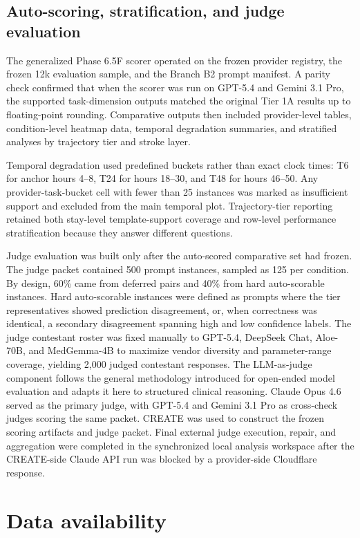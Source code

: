 \documentclass[pdflatex,sn-nature]{sn-jnl}
\begin{document}
\subsection{Auto-scoring, stratification, and judge evaluation}

The generalized Phase 6.5F scorer operated on the frozen provider registry, the frozen 12k evaluation sample, and the Branch B2 prompt manifest. A parity check confirmed that when the scorer was run on GPT-5.4 and Gemini 3.1 Pro, the supported task-dimension outputs matched the original Tier 1A results up to floating-point rounding. Comparative outputs then included provider-level tables, condition-level heatmap data, temporal degradation summaries, and stratified analyses by trajectory tier and stroke layer.

Temporal degradation used predefined buckets rather than exact clock times: T6 for anchor hours 4--8, T24 for hours 18--30, and T48 for hours 46--50. Any provider-task-bucket cell with fewer than 25 instances was marked as insufficient support and excluded from the main temporal plot. Trajectory-tier reporting retained both stay-level template-support coverage and row-level performance stratification because they answer different questions.

Judge evaluation was built only after the auto-scored comparative set had frozen. The judge packet contained 500 prompt instances, sampled as 125 per condition. By design, 60\% came from deferred pairs and 40\% from hard auto-scorable instances. Hard auto-scorable instances were defined as prompts where the tier representatives showed prediction disagreement, or, when correctness was identical, a secondary disagreement spanning high and low confidence labels. The judge contestant roster was fixed manually to GPT-5.4, DeepSeek Chat, Aloe-70B, and MedGemma-4B to maximize vendor diversity and parameter-range coverage, yielding 2,000 judged contestant responses. The LLM-as-judge component follows the general methodology introduced for open-ended model evaluation and adapts it here to structured clinical reasoning\cite{zheng2023judging}. Claude Opus 4.6 served as the primary judge, with GPT-5.4 and Gemini 3.1 Pro as cross-check judges scoring the same packet. CREATE was used to construct the frozen scoring artifacts and judge packet. Final external judge execution, repair, and aggregation were completed in the synchronized local analysis workspace after the CREATE-side Claude API run was blocked by a provider-side Cloudflare response.

\section*{Data availability}
\end{document}
